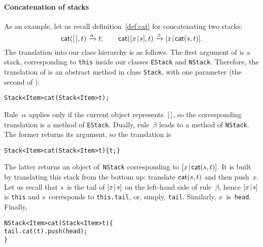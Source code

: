 \paragraph{Concatenation of stacks}

As an example, let us
recall definition~\eqref{def:cat} 
 for concatenating two stacks:
\begin{equation*}
\textsf{cat}(        [\,],t) \xrightarrow{\smash{\alpha}} t;\qquad
\textsf{cat}([{x}\!\mid\!{s}],t) \xrightarrow{\smash{\beta}}
                                          [{x}\!\mid\!{\textsf{cat}(s,t)}].
\end{equation*}
The translation into our \Java class hierarchy is as follows. The
first argument of  is a stack, corresponding to
\texttt{this} inside our classes \texttt{EStack} and
\texttt{NStack}. Therefore, the translation of  is an
abstract \Java method in class \texttt{Stack}, with one parameter (the
second of ):
\begin{alltt}
\public \abstractX Stack<Item> cat(\final Stack<Item> t);
\end{alltt}
Rule~\(\alpha\) applies only if the current object represents~\([\,]\),
so the corresponding translation is a method of
\texttt{EStack}. Dually, rule~\(\beta\) leads to a method of
\texttt{NStack}. The former returns its argument, so the translation
is
\begin{alltt}
\public Stack<Item> cat(\final Stack<Item> t) \{ \return t; \}
\end{alltt}
The latter returns an object of~\texttt{NStack} corresponding to
\([{x}\!\mid\!{\textsf{cat}(s,t)}]\). It is built by translating this stack
from the bottom up: translate
\(\textsf{cat}(s,t)\) and then push~\(x\). Let
us recall that \(s\)~is the tail of \([{x}\!\mid\!{s}]\) on the
left\hyp{}hand side of rule~\(\beta\), hence \([{x}\!\mid\!{s}]\) is
\texttt{this} and \(s\)~corresponds to \texttt{this.tail}, or, simply,
\texttt{tail}. Similarly, \(x\)~is~\texttt{head}. Finally,
\begin{alltt}
\public NStack<Item> cat(\final Stack<Item> t) \{
  \return tail.cat(t).push(head);
\}
\end{alltt}

